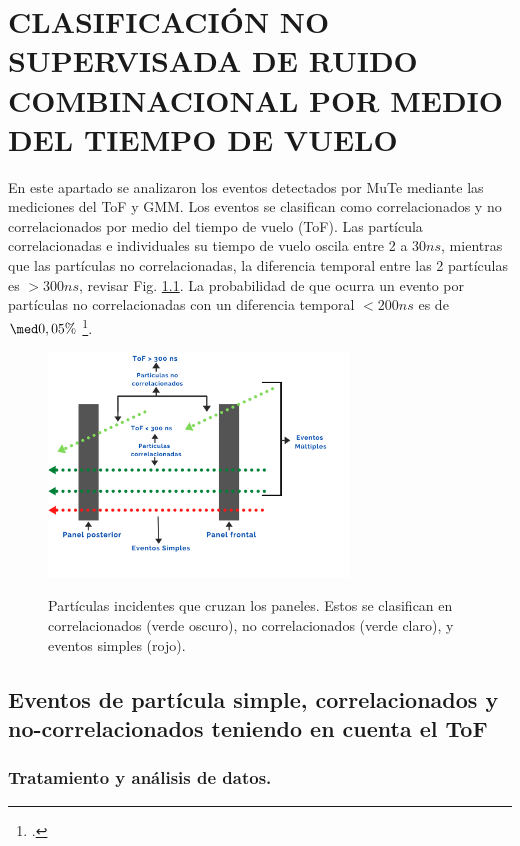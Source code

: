 \chapter{\MakeUppercase{Clasificación no supervisada de ruido combinacional por medio del tiempo de vuelo}}

En este apartado se analizaron los eventos detectados por MuTe mediante las mediciones del ToF y GMM. Los eventos se clasifican como correlacionados y no correlacionados por medio del tiempo de vuelo (ToF).  Las partícula correlacionadas e individuales su tiempo de vuelo oscila entre 2 a 30$ ns$, mientras que las partículas no correlacionadas, la diferencia temporal entre las 2 partículas es $> 300 ns$, revisar Fig. \ref{placas}. La probabilidad de que ocurra un evento por partículas no correlacionadas con un diferencia temporal $<  200ns$ es de $\med 0,05\%$ \footcite{jesusP}.

\begin{figure}[h!]
\begin{center}
\caption{Partículas incidentes que cruzan los paneles. Estos se clasifican en correlacionados (verde oscuro), no correlacionados (verde claro), y eventos simples (rojo).}
\includegraphics[width=0.71\textwidth]{Figures/imagenes/panel.png}
\label{placas}
\end{center}
\end{figure}

\section{Eventos de partícula simple, correlacionados y no-correlacionados teniendo en cuenta el ToF }


\subsection{Tratamiento y análisis de datos.\\}

